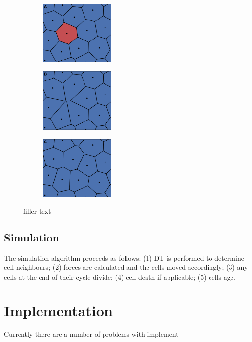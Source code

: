 \documentclass[a4paper]{article}
\begin{document}
\begin{figure}[htbp]
\centering
\begin{subfigure}{0.24\textwidth}
	\centering
	\includegraphics[width=3.7cm]{dead_1.png}
	\label{fig:divideA}
\end{subfigure} \hspace{0.02cm}
\centering
\begin{subfigure}{0.24\textwidth}
	\centering
	\includegraphics[width=3.7cm]{dead_2.png}
	\label{fig:divideA}
\end{subfigure} \hspace{0.02cm}
\centering
\begin{subfigure}{0.24\textwidth}
	\centering
	\includegraphics[width=3.7cm]{dead_3.png}
	\label{fig:divideA}
\end{subfigure}
\caption{filler text}
\label{fig:manmade}
\end{figure}

\subsection{Simulation}
The simulation algorithm proceeds as follows: (1) DT is performed to determine cell neighbours; (2) forces are calculated and the cells moved accordingly; (3) any cells at the end of their cycle divide; (4) cell death if applicable; (5) cells age.

\section{Implementation}
Currently there are a number of problems with implement
 
 

\end{document}

